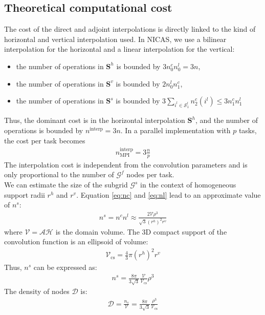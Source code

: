 \documentclass[12pt]{scrartcl}
\begin{document}
\subsection{Theoretical computational cost}
The cost of the direct and adjoint interpolations is directly linked to the kind of horizontal and vertical interpolation used. In NICAS, we use a bilinear interpolation for the horizontal and a linear interpolation for the vertical:
\begin{itemize}
\item the number of operations in $\mathbf{S}^h$ is bounded by $3 n^c_0 n^l_0 = 3n$,
\item the number of operations in $\mathbf{S}^v$ is bounded by $2 n^l_0 n^c_1$,
\item the number of operations in $\mathbf{S}^s$ is bounded by $\displaystyle 3 \sum_{i^l \in \mathcal{S}^l_1} n^c_2(i^l) \le 3 n^c_1 n^l_1$
\end{itemize}
Thus, the dominant cost is in the horizontal interpolation $\mathbf{S}^h$, and the number of operations is bounded by $n^\mathrm{interp} = 3n$. In a parallel implementation with $p$ tasks, the cost per task becomes 
\begin{align}
n^\mathrm{interp}_\mathrm{MPI} = 3 \frac{n}{p}
\end{align}
The interpolation cost is independent from the convolution parameters and is only proportional to the number of $\mathcal{G}^f$ nodes per task.\\
$  $\\
We can estimate the size of the subgrid $\mathcal{G}^s$ in the context of homogeneous support radii $r^h$ and $r^v$. Equation \ref{eq:nc} and \ref{eq:nl} lead to an approximate value of $n^s$:
\begin{align}
n^s = n^c n^l \approx \frac{2 \mathcal{V} \rho^3}{\sqrt{3} \left(r^h\right)^2 r^v}
\end{align}
where $\mathcal{V} = \mathcal{A} \mathcal{H}$ is the domain volume. The 3D compact support of the convolution function is an ellipsoid of volume:
\begin{align}
\mathcal{V}_\mathrm{cs} = \frac{4}{3} \pi \left(r^h\right)^2 r^v
\end{align}
Thus, $n^s$ can be expressed as:
\begin{align}
n^s = \frac{8 \pi}{3\sqrt{3}} \frac{\mathcal{V}}{\mathcal{V}_\mathrm{cs}} \rho^3
\end{align}
The density of nodes $\mathcal{D}$ is:
\begin{align}
\mathcal{D} = \frac{n_s}{\mathcal{V}} = \frac{8\pi}{3\sqrt{3}} \frac{\rho^3}{\mathcal{V}_\mathrm{cs}} 
\end{align}
\end{document}
